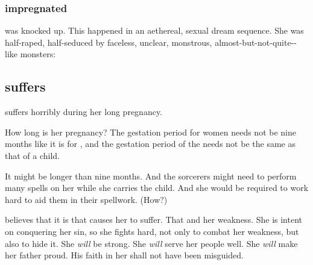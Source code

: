 \subsubsection{\Ilu{} impregnated}
\Ilu{} was knocked up. 
This happened in an aethereal, sexual dream sequence. 
She was half-raped, half-seduced by faceless, unclear, monstrous, almost-but-not-quite-\nephil-like monsters:











\subsection{\Ilu{} suffers}
\Ilu{} suffers horribly during her long pregnancy. 

How long is her pregnancy? The gestation period for \nephil{} women needs not be nine months like it is for \humans, and the gestation period of the \banemessiah{} needs not be the same as that of a \nephil{} child. 

It might be longer than nine months. And the sorcerers might need to perform many spells on her while she carries the child. And she would be required to work hard to aid them in their spellwork. (How?) 

\Ilu{} believes that it is  that causes her to suffer. That and her weakness. She is intent on conquering her sin, so she fights hard, not only to combat her weakness, but also to hide it. She \emph{will} be strong. She \emph{will} serve her people well. She \emph{will} make her father proud. His faith in her shall not have been misguided. 

